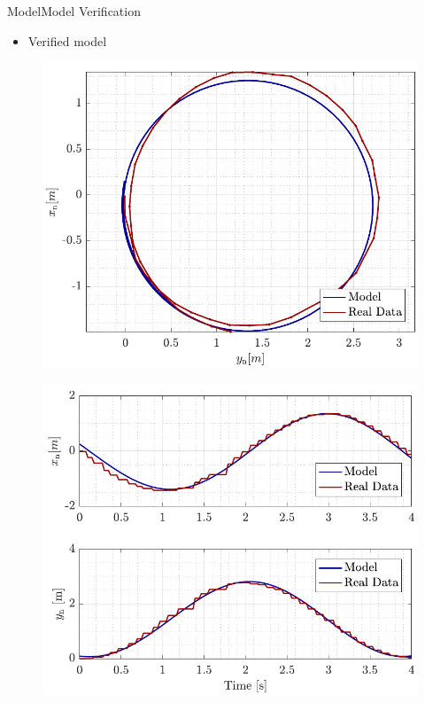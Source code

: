 \begin{frame}{Model}{Model Verification}
    \begin{itemize}
        \item Verified model
    \end{itemize}
    \begin{minipage}{0.45\linewidth}
        \begin{figure}[H]
            \centering
            \includegraphics[width=1\linewidth]{figures/turn}
        \end{figure}        
    \end{minipage}\hfill      
    \begin{minipage}{0.45\linewidth}
        \begin{figure}[H]
            \centering
            \includegraphics[width=1\linewidth]{figures/turn_time}
        \end{figure}                
    \end{minipage}\hfill \\
\end{frame}






